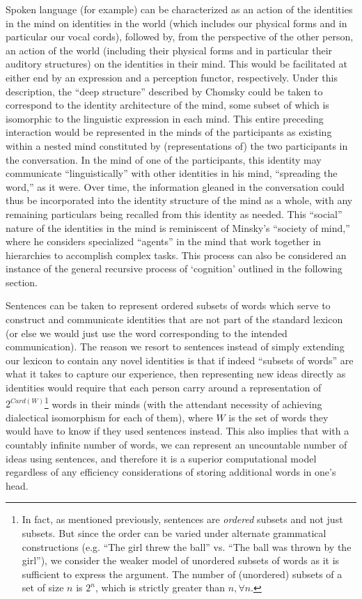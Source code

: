 \documentclass[pra,twocolumn,groupedaddress,10pt]{revtex4}
\theoremstyle{definition}
\begin{document}
Spoken language (for example) can be characterized as an action of the identities in the mind on identities in the world (which includes our physical forms and in particular our vocal cords), followed by, from the perspective of the other person, an action of the world (including their physical forms and in particular their auditory structures) on the identities in their mind. This would be facilitated at either end by an expression and a perception functor, respectively. Under this description, the ``deep structure'' described by Chomsky\cite{chomsky} could be taken to correspond to the identity architecture of the mind, some subset of which is isomorphic to the linguistic expression in each mind. This entire preceding interaction would be represented in the minds of the participants as existing within a nested mind constituted by (representations of) the two participants in the conversation. In the mind of one of the participants, this identity may communicate ``linguistically'' with other identities in his mind, ``spreading the word,'' as it were. Over time, the information gleaned in the conversation could thus be incorporated into the identity structure of the mind as a whole, with any remaining particulars being recalled from this identity as needed. This ``social'' nature of the identities in the mind is reminiscent of Minsky's ``society of mind,''\cite{minsky} where he considers specialized ``agents'' in the mind that work together in hierarchies to accomplish complex tasks. This process can also be considered an instance of the general recursive process of `cognition' outlined in the following section.

Sentences can be taken to represent ordered subsets of words which serve to construct and communicate identities that are not part of the standard lexicon (or else we would just use the word corresponding to the intended communication). The reason we resort to sentences instead of simply extending our lexicon to contain any novel identities is that if indeed ``subsets of words'' are what it takes to capture our experience, then representing new ideas directly as identities would require that each person carry around a representation of $2^{Card(W)}$\footnote{In fact, as mentioned previously, sentences are \textit{ordered} subsets and not just subsets. But since the order can be varied under alternate grammatical constructions (e.g. ``The girl threw the ball'' vs. ``The ball was thrown by the girl''), we consider the weaker model of unordered subsets of words as it is sufficient to express the argument. The number of (unordered) subsets of a set of size $n$ is $2^{n}$, which is strictly greater than $n, \forall n$.} words in their minds (with the attendant necessity of achieving dialectical isomorphism for each of them), where $W$ is the set of words they would have to know if they used sentences instead. This also implies that with a countably infinite number of words, we can represent an uncountable number of ideas using sentences, and therefore it is a superior computational model regardless of any efficiency considerations of storing additional words in one's head.
\end{document}
